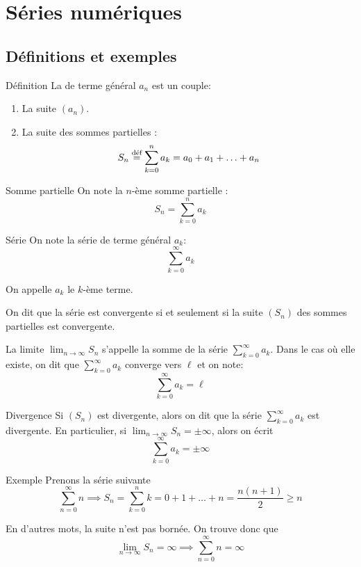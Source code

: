 \documentclass[a4paper]{article}
\begin{document}
\section{Séries numériques}
\subsection{Définitions et exemples}
\begin{parag}{Définition}
    La  de terme général $a_n$ est un couple:
    \begin{enumerate}
        \item La suite $\left(a_n\right)$.
        \item La suite des sommes partielles :
        \[S_n \over{=}{déf} \sum_{k=0}^{n} a_k = a_0 + a_1 + \ldots + a_n\]
    \end{enumerate}
\end{parag}

\begin{parag}{Somme partielle}
    On note la $n$-ème somme partielle :
    \[S_n = \sum_{k=0}^{n} a_k\]
\end{parag}

\begin{parag}{Série}
    On note la série de terme général $a_k$: 
    \[\sum_{k=0}^{\infty} a_k\]

    On appelle $a_k$ le $k$-ème terme.

    On dit que la série est convergente si et seulement si la suite $\left(S_n\right)$ des sommes partielles est convergente. 
    
    La limite $\lim_{n \to \infty} S_n$ s'appelle la somme de la série $\sum_{k=0}^{\infty} a_k$. Dans le cas où elle existe, on dit que $\sum_{k=0}^{\infty} a_k$ converge vers $\ell$ et on note: 
    \[\sum_{k=0}^{\infty} a_k = \ell\]
    
\end{parag}

\begin{parag}{Divergence}
    Si $\left(S_n\right)$ est divergente, alors on dit que la série $\sum_{k=0}^{\infty} a_k$ est divergente. En particulier, si $\lim_{n \to \infty} S_n = \pm\infty$, alors on écrit 
    \[\sum_{k=0}^{\infty} a_k = \pm\infty\]
\end{parag}


\begin{parag}{Exemple}
    Prenons la série suivante 
    \[\sum_{n=0}^{\infty} n \implies S_n = \sum_{k=0}^{n} k = 0 + 1 + \ldots + n = \frac{n\left(n+1\right)}{2} \geq n\]

    En d'autres mots, la suite n'est pas bornée. On trouve donc que 
    \[\lim_{n \to \infty} S_n = \infty \implies \sum_{n=0}^{\infty} n = \infty\]
\end{parag}
\end{document}

